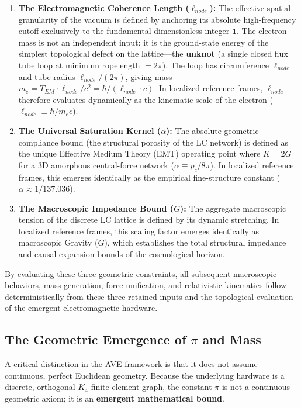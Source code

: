 \begin{enumerate}
    \item \textbf{The Electromagnetic Coherence Length ($\ell_{node}$):} The effective spatial granularity of the vacuum is defined by anchoring its absolute high-frequency cutoff exclusively to the fundamental dimensionless integer $\mathbf{1}$. The electron mass is not an independent input: it is the ground-state energy of the simplest topological defect on the lattice---the \textbf{unknot} (a single closed flux tube loop at minimum ropelength $= 2\pi$). The loop has circumference $\ell_{node}$ and tube radius $\ell_{node}/(2\pi)$, giving mass $m_e = T_{EM} \cdot \ell_{node}/c^2 = \hbar/(\ell_{node} \cdot c)$. In localized reference frames, $\ell_{node}$ therefore evaluates dynamically as the kinematic scale of the electron ($\ell_{node} \equiv \hbar / m_e c$). 
    \item \textbf{The Universal Saturation Kernel ($\alpha$):} The absolute geometric compliance bound (the structural porosity of the LC network) is defined as the unique Effective Medium Theory (EMT) operating point where $K = 2G$ for a 3D amorphous central-force network ($\alpha \equiv p_c / 8\pi$). In localized reference frames, this emerges identically as the empirical fine-structure constant ($\alpha \approx 1/137.036$).
    \item \textbf{The Macroscopic Impedance Bound ($G$):} The aggregate macroscopic tension of the discrete LC lattice is defined by its dynamic stretching. In localized reference frames, this scaling factor emerges identically as macroscopic Gravity ($G$), which establishes the total structural impedance and causal expansion bounds of the cosmological horizon.
\end{enumerate}

By evaluating these three geometric constraints, all subsequent macroscopic behaviors, mass-generation, force unification, and relativistic kinematics follow deterministically from these three retained inputs and the topological evaluation of the emergent electromagnetic hardware.

\subsection{The Geometric Emergence of $\pi$ and Mass}
A critical distinction in the AVE framework is that it does not assume continuous, perfect Euclidean geometry. Because the underlying hardware is a discrete, orthogonal $K_4$ finite-element graph, the constant $\pi$ is not a continuous geometric axiom; it is an \textbf{emergent mathematical bound}.

